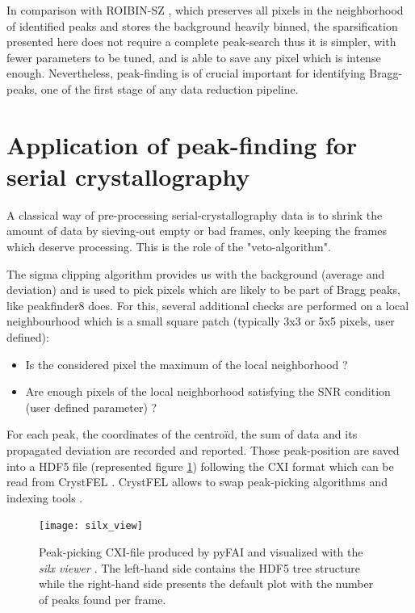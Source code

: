 \documentclass[preprint]{iucr}              %
\begin{document}
In comparison with ROIBIN-SZ \cite{roibin}, which preserves all pixels in the neighborhood of identified peaks and stores the background heavily binned, the sparsification presented here does not require a complete peak-search thus it is simpler, with fewer parameters to be tuned, and is able to save any pixel which is intense enough.
Nevertheless, peak-finding is of crucial important for identifying Bragg-peaks, one of the first stage of any data reduction pipeline.

\section{Application of peak-finding for serial crystallography}
A classical way of pre-processing serial-crystallography data is to shrink the amount of data by sieving-out empty or bad frames, only keeping the frames which deserve processing. 
This is the role of the "veto-algorithm".

The sigma clipping algorithm provides us with the background (average and deviation) and is used to pick pixels which are likely to be part of Bragg peaks, like peakfinder8 \cite{Cheetah2014} does. 
For this, several additional checks are performed on a local neighbourhood which is a small square patch (typically 3x3 or 5x5 pixels, user defined):
\begin{itemize}
\item Is the considered pixel the maximum of the local neighborhood ?
\item Are enough pixels of the local neighborhood satisfying the SNR condition (user defined parameter) ?
\end{itemize}

For each peak, the coordinates of the centroïd, the sum of data and its propagated deviation are recorded and reported. 
Those peak-position are saved into a HDF5 file (represented figure \ref{silx}) following the CXI format \cite{cxi} which can be read from CrystFEL \cite{CrystFEL}.
CrystFEL allows to swap peak-picking algorithms \cite{zaefferer, Cheetah2014, robustpeakfinder} and indexing tools \cite{xds, mosflm, taketwo, xgandalf, pinkindexer}.

\begin{figure}
\label{silx}
\texttt{[image: silx\_view]}
\caption{Peak-picking CXI-file produced by pyFAI and visualized with the \textit{silx viewer} \cite{silx}.
The left-hand side contains the HDF5 tree structure while the right-hand side presents the default plot with the number of peaks found per frame.}
\end{figure}
\end{document}
